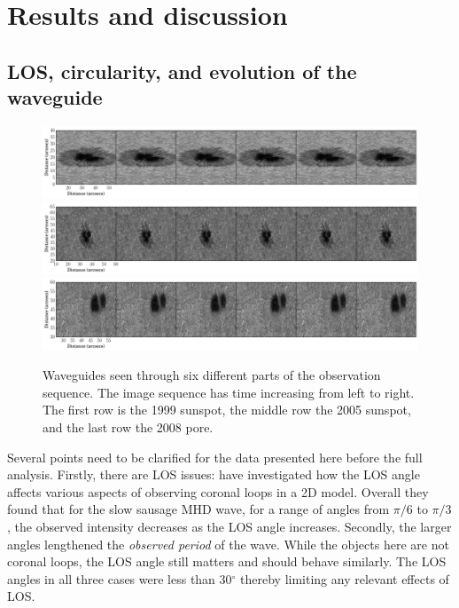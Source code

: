 \section{Results and discussion}

\subsection{LOS, circularity, and evolution of the waveguide}

    \begin{figure}
		\centering
        \includegraphics[height=0.19\textheight,width=\textwidth]{1999.pdf}\vspace*{-0.2cm}
        \includegraphics[height=0.19\textheight,width=\textwidth]{2005.pdf}\vspace*{-0.2cm}
        \includegraphics[height=0.19\textheight,width=\textwidth]{2008.pdf}\vspace*{-0.2cm}
        \caption{
            Waveguides seen through six different parts of the observation sequence.
            The image sequence has time increasing from left to right.
            The first row is the 1999 sunspot, the middle row the 2005 sunspot, and the last row the 2008 pore.
                }
        \label{data}
    \end{figure}
	
	Several points need to be clarified for the data presented here before the full analysis.
	Firstly, there are LOS issues: \citet{2003A&A...397..765C,2003A&A...409..325C} have investigated how the LOS angle affects various aspects of observing coronal loops in a 2D model.
	Overall they found that for the slow sausage MHD wave, for a range of angles from $\pi/6$ to $\pi/3$, the observed intensity decreases as the LOS angle increases.
	Secondly, the larger angles lengthened the \textit{observed period} of the wave.
	While the objects here are not coronal loops, the LOS angle still matters and should behave similarly.
	The LOS angles in all three cases were less than 30$^\circ$ thereby limiting any relevant effects of LOS.
	
